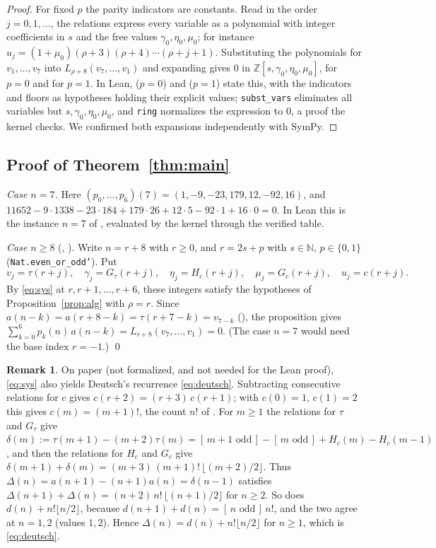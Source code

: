 \documentclass[11pt]{amsart}
\theoremstyle{plain}
\theoremstyle{definition}
\newtheorem{remark}[theorem]{Remark}
\newcommand{\N}{\mathbb{N}}
\newcommand{\Z}{\mathbb{Z}}
\newcommand{\Iv}[1]{[\,#1\,]}
\begin{document}
\begin{proof}
For fixed $p$ the parity indicators are constants. Read in the order $j=0,1,\dots$, the relations express every variable as a polynomial with integer coefficients in $s$ and the free values $\gamma_0,\eta_0,\mu_0$; for instance $u_{j}=(1+\mu_0)(\rho+3)(\rho+4)\cdots(\rho+j+1)$. Substituting the polynomials for $v_1,\dots,v_7$ into $L_{\rho+8}(v_7,\dots,v_1)$ and expanding gives $0$ in $\Z[s,\gamma_0,\eta_0,\mu_0]$, for $p=0$ and for $p=1$. In Lean,  ($p=0$) and  ($p=1$) state this, with the indicators and floors as hypotheses holding their explicit values; \texttt{subst\_vars} eliminates all variables but $s,\gamma_0,\eta_0,\mu_0$, and \texttt{ring} normalizes the expression to $0$, a proof the kernel checks. We confirmed both expansions independently with SymPy.
\end{proof}

\subsection{Proof of Theorem~\ref{thm:main}}
\emph{Case $n=7$.} Here $(p_0,\dots,p_6)(7)=(1,-9,-23,179,12,-92,16)$, and $11652-9\cdot1338-23\cdot184+179\cdot26+12\cdot5-92\cdot1+16\cdot0=0$. In Lean this is the instance $n=7$ of , evaluated by the kernel through the verified table.

\emph{Case $n\ge8$} (, ). Write $n=r+8$ with $r\ge0$, and $r=2s+p$ with $s\in\N$, $p\in\{0,1\}$ (\texttt{Nat.even\_or\_odd'}). Put
\[
  v_j=\tau(r+j),\quad \gamma_j=G_\tau(r+j),\quad \eta_j=H_c(r+j),\quad \mu_j=G_c(r+j),\quad u_j=c(r+j).
\]
By \eqref{eq:sys} at $r,r+1,\dots,r+6$, these integers satisfy the hypotheses of Proposition~\ref{prop:alg} with $\rho=r$. Since $a(n-k)=a(r+8-k)=\tau(r+7-k)=v_{7-k}$ (), the proposition gives $\sum_{k=0}^{6}p_k(n)\,a(n-k)=L_{r+8}(v_7,\dots,v_1)=0$. (The case $n=7$ would need the base index $r=-1$.) \qed

\begin{remark}\label{rem:deutsch}
On paper (not formalized, and not needed for the Lean proof), \eqref{eq:sys} also yields Deutsch's recurrence \eqref{eq:deutsch}. Subtracting consecutive relations for $c$ gives $c(r+2)=(r+3)\,c(r+1)$; with $c(0)=1$, $c(1)=2$ this gives $c(m)=(m+1)!$, the count $n!$ of \cite{BDP}. For $m\ge1$ the relations for $\tau$ and $G_\tau$ give $\delta(m):=\tau(m+1)-(m+2)\tau(m)=\Iv{m+1\text{ odd}}-\Iv{m\text{ odd}}+H_c(m)-H_c(m-1)$, and then the relations for $H_c$ and $G_c$ give $\delta(m+1)+\delta(m)=(m+3)\,(m+1)!\,\lfloor (m+2)/2\rfloor$. Thus $\Delta(n)=a(n+1)-(n+1)a(n)=\delta(n-1)$ satisfies $\Delta(n+1)+\Delta(n)=(n+2)\,n!\,\lfloor(n+1)/2\rfloor$ for $n\ge2$. So does $d(n)+n!\lfloor n/2\rfloor$, because $d(n+1)+d(n)=\Iv{n\text{ odd}}\,n!$, and the two agree at $n=1,2$ (values $1,2$). Hence $\Delta(n)=d(n)+n!\lfloor n/2\rfloor$ for $n\ge1$, which is \eqref{eq:deutsch}.
\end{remark}
\end{document}
